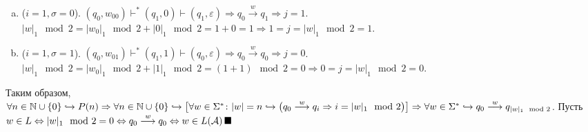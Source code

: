 \documentclass[a4paper]{article}
\def\A{{\cal A}}
\begin{document}
\begin{enumerate}
\begin{enumerate}
\begin{enumerate}[a.]
\item ($i=1,\sigma=0$). $(q_0,w_00)\vdash^*(q_1,0)\vdash(q_1,\varepsilon)\Rightarrow q_0\overset{w}{\longrightarrow}q_1\Rightarrow j=1$. $|w|_1\mod 2=|w_0|_1\mod 2+|0|_1\mod 2=1+0=1\Rightarrow 1=j=|w|_1\mod 2=1$.
\item ($i=1,\sigma=1$). $(q_0,w_01)\vdash^*(q_1,1)\vdash(q_0,\varepsilon)\Rightarrow q_0\overset{w}{\longrightarrow}q_0\Rightarrow j=0$. $|w|_1\mod 2=|w_0|_1\mod 2+|1|_1\mod 2=(1+1)\mod 2=0\Rightarrow 0=j=|w|_1\mod 2=0$.
\end{enumerate}
\end{enumerate}
Таким образом, $\forall n\in{\mathbb N}\cup\{0\}\hookrightarrow P(n)\Rightarrow \forall n\in{\mathbb N}\cup\{0\}\hookrightarrow \big[\forall w\in\Sigma^*\colon |w|=n\hookrightarrow \big(q_0\overset{w}{\longrightarrow}q_i\Rightarrow i=|w|_1\mod 2\big)\big]\Rightarrow\newline\forall w\in\Sigma^*\hookrightarrow q_0\overset{w}{\longrightarrow}q_{|w|_1\mod 2}$.
Пусть $w\in L\Leftrightarrow |w|_1\mod 2=0\Leftrightarrow q_0\overset{w}{\longrightarrow}q_0\Leftrightarrow w\in L(\A)\,\blacksquare$
\end{enumerate}
\end{document}
